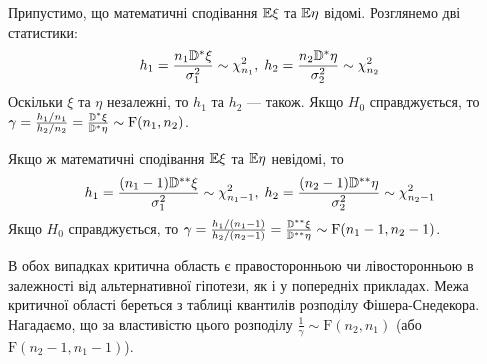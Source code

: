 Припустимо, що математичні сподівання $\mathbb{E}\xi$ та $\mathbb{E}\eta$ відомі. Розглянемо дві статистики:
\begin{gather*}
    h_1 = \frac{n_1 \mathbb{D}^* \xi}{\sigma_1^2} \sim \chi^2_{n_1}, \;
    h_2 = \frac{n_2 \mathbb{D}^* \eta}{\sigma_2^2} \sim \chi^2_{n_2}
\end{gather*}
Оскільки $\xi$ та $\eta$ незалежні, то $h_1$ та $h_2$ --- також. Якщо $H_0$ справджується, то
$\gamma = \frac{h_1/n_1}{h_2/n_2} = \frac{\mathbb{D}^*\xi}{\mathbb{D}^*\eta} \sim \mathrm{F}(n_1, n_2)$.

Якщо ж математичні сподівання $\mathbb{E}\xi$ та $\mathbb{E}\eta$ невідомі, то
\begin{gather*}
    h_1 = \frac{(n_1-1) \mathbb{D}^{**} \xi}{\sigma_1^2} \sim \chi^2_{n_1-1}, \;
    h_2 = \frac{(n_2-1) \mathbb{D}^{**} \eta}{\sigma_2^2} \sim \chi^2_{n_2-1}
\end{gather*}
Якщо $H_0$ справджується, то
$\gamma = \frac{h_1/(n_1-1)}{h_2/(n_2-1)} = \frac{\mathbb{D}^{**}\xi}{\mathbb{D}^{**}\eta} \sim \mathrm{F}(n_1-1, n_2-1)$.

В обох випадках критична область є правосторонньою чи лівосторонньою в залежності від альтернативної гіпотези,
як і у попередніх прикладах. Межа критичної області береться з таблиці 
квантилів розподілу Фішера-Снедекора. Нагадаємо, що за властивістю цього розподілу
$\frac{1}{\gamma} \sim \mathrm{F}(n_2, n_1)$ (або $\mathrm{F}(n_2-1, n_1-1)$).

